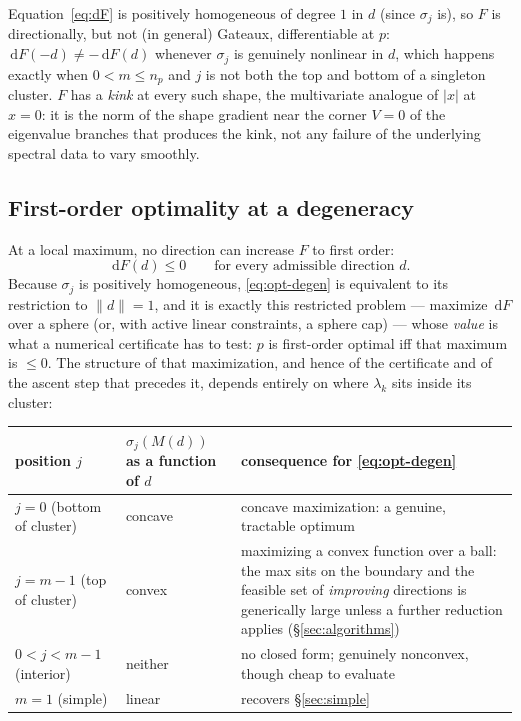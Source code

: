 \documentclass[11pt]{article}
\newcommand{\dd}{\,\mathrm{d}}
\theoremstyle{plain}
\begin{document}
Equation~\eqref{eq:dF} is positively homogeneous of degree $1$ in $d$ (since $\sigma_j$ is), so
$F$ is directionally, but not (in general) Gateaux, differentiable at $p$: $\dd F(-d)\ne-\dd F(d)$
whenever $\sigma_j$ is genuinely nonlinear in $d$, which happens exactly when $0<m\le n_p$ and $j$
is not both the top and bottom of a singleton cluster. $F$ has a \emph{kink} at every such shape,
the multivariate analogue of $|x|$ at $x=0$: it is the norm of the shape gradient near the corner
$V=0$ of the eigenvalue branches that produces the kink, not any failure of the underlying spectral
data to vary smoothly.

\subsection{First-order optimality at a degeneracy}\label{sec:optimality-degen}

At a local maximum, no direction can increase $F$ to first order:
\begin{equation}\label{eq:opt-degen}
  \dd F(d)\le0\qquad\text{for every admissible direction }d .
\end{equation}
Because $\sigma_j$ is positively homogeneous, \eqref{eq:opt-degen} is equivalent to its restriction
to $\|d\|=1$, and it is exactly this restricted problem --- maximize $\dd F$ over a sphere (or, with
active linear constraints, a sphere cap) --- whose \emph{value} is what a numerical certificate has
to test: $p$ is first-order optimal iff that maximum is $\le0$. The structure of that maximization,
and hence of the certificate and of the ascent step that precedes it, depends entirely on where
$\lambda_k$ sits inside its cluster:

\begin{center}
\begin{tabularx}{\textwidth}{@{}lLL@{}}
\toprule
position $j$ & $\sigma_j(M(d))$ as a function of $d$ & consequence for \eqref{eq:opt-degen}\\
\midrule
$j=0$ (bottom of cluster) & concave & concave maximization: a genuine, tractable optimum\\
$j=m-1$ (top of cluster) & convex & maximizing a convex function over a ball: the max sits on the
  boundary and the feasible set of \emph{improving} directions is generically large unless a
  further reduction applies (\S\ref{sec:algorithms})\\
$0<j<m-1$ (interior) & neither & no closed form; genuinely nonconvex, though cheap to evaluate\\
$m=1$ (simple) & linear & recovers \S\ref{sec:simple}\\
\bottomrule
\end{tabularx}
\end{center}
\end{document}
